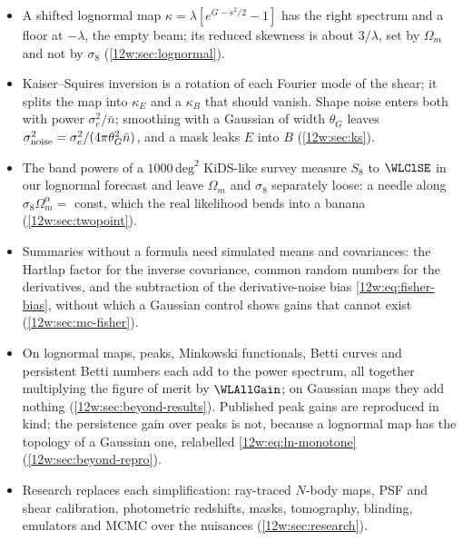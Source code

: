 \begin{recap}
\begin{itemize}[itemsep=1pt,leftmargin=1.2em]
  \item A shifted lognormal map $\kappa=\lambda[e^{G-s^2/2}-1]$ has the right spectrum and a floor at $-\lambda$, the
        empty beam; its reduced skewness is about $3/\lambda$, set by $\Omega_m$ and not by $\sigma_8$
        (\cref{12w:sec:lognormal}).
  \item Kaiser--Squires inversion is a rotation of each Fourier mode of the shear; it splits the map into $\kappa_E$
        and a $\kappa_B$ that should vanish. Shape noise enters both with power $\sigma_e^2/\bar n$; smoothing with a
        Gaussian of width $\theta_G$ leaves $\sigma_{\rm noise}^2=\sigma_e^2/(4\pi\theta_G^2\bar n)$, and a mask leaks
        $E$ into $B$ (\cref{12w:sec:ks}).
  \item The band powers of a $1000\,\mathrm{deg}^2$ KiDS-like survey measure $S_8$ to $\WLClSE$ in our lognormal
        forecast and leave $\Omega_m$ and $\sigma_8$ separately loose: a needle along $\sigma_8\Omega_m^{\alpha}=$ const,
        which the real likelihood bends into a banana (\cref{12w:sec:twopoint}).
  \item Summaries without a formula need simulated means and covariances: the Hartlap factor for the inverse
        covariance, common random numbers for the derivatives, and the subtraction of the derivative-noise bias
        \eqref{12w:eq:fisher-bias}, without which a Gaussian control shows gains that cannot exist
        (\cref{12w:sec:mc-fisher}).
  \item On lognormal maps, peaks, Minkowski functionals, Betti curves and persistent Betti numbers each add to the
        power spectrum, all together multiplying the figure of merit by $\WLAllGain$; on Gaussian maps they add
        nothing (\cref{12w:sec:beyond-results}). Published peak gains are reproduced in kind; the persistence gain over
        peaks is not, because a lognormal map has the topology of a Gaussian one, relabelled
        \eqref{12w:eq:ln-monotone} (\cref{12w:sec:beyond-repro}).
  \item Research replaces each simplification: ray-traced $N$-body maps, PSF and shear calibration, photometric
        redshifts, masks, tomography, blinding, emulators and MCMC over the nuisances (\cref{12w:sec:research}).
\end{itemize}
\end{recap}
\providecommand{\CtEbZero}{}\renewcommand{\CtEbZero}{1.28125}
